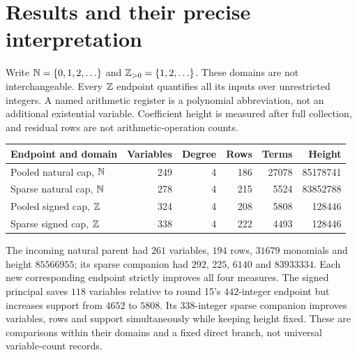 \section{Results and their precise interpretation}
Write $\mathbb N=\{0,1,2,\ldots\}$ and $\mathbb Z_{>0}=\{1,2,\ldots\}$. These domains are not interchangeable. Every $\mathbb Z$ endpoint quantifies all its inputs over unrestricted integers. A named arithmetic register is a polynomial abbreviation, not an additional existential variable. Coefficient height is measured after full collection, and residual rows are not arithmetic-operation counts.

\begin{center}\small
\begin{tabular}{@{}lrrrrr@{}}\toprule
Endpoint and domain&Variables&Degree&Rows&Terms&Height\\\midrule
Pooled natural cap, $\mathbb N$&249&4&186&27078&85178741\\
Sparse natural cap, $\mathbb N$&278&4&215&5524&83852788\\
Pooled signed cap, $\mathbb Z$&324&4&208&5808&128446\\
Sparse signed cap, $\mathbb Z$&338&4&222&4493&128446\\\bottomrule
\end{tabular}\end{center}
The incoming natural parent had $261$ variables, $194$ rows, $31679$ monomials and height $85566955$; its sparse companion had $292$, $225$, $6140$ and $83933334$. Each new corresponding endpoint strictly improves all four measures. The signed principal saves $118$ variables relative to round 15's $442$-integer endpoint but increases support from $4652$ to $5808$. Its $338$-integer sparse companion improves variables, rows and support simultaneously while keeping height fixed. These are comparisons within their domains and a fixed direct branch, not universal variable-count records.


